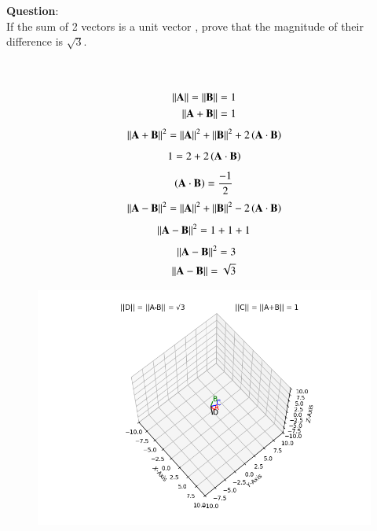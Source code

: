 \documentclass[journal]{IEEEtran}
\begin{document}
\textbf{Question}:\\
If the sum of 2 vectors is a unit vector , prove that the magnitude of their difference is $\sqrt{3}$.\hfill{}\\
\\ \solution \\
    \begin{table}[h!]    
      \centering
      
      \caption{}
    \end{table}
    \begin{align}
        \left\vert\left\vert\mathbf{A}\right\vert\right\vert = \left\vert\left\vert\mathbf{B}\right\vert\right\vert = 1 \\ \label{eq1.11.12.1}
        \left\vert\left\vert\mathbf{A}+\mathbf{B}\right\vert\right\vert = 1 
    \end{align}
    \begin{align}
        \left\vert\left\vert\mathbf{A}+\mathbf{B}\right\vert\right\vert^2 = \left\vert\left\vert\mathbf{A}\right\vert\right\vert^2 + \left\vert\left\vert\mathbf{B}\right\vert\right\vert^2 + 2\left(\mathbf{A} \cdot \mathbf{B}\right)\label{eq1.11.12.2}
    \end{align}
    \begin{align}
        1 = 2 + 2\left(\mathbf{A} \cdot \mathbf{B}\right) \label{eq1.11.12.3}
    \end{align}
    \begin{align}
        \left(\mathbf{A} \cdot \mathbf{B}\right) = \frac{-1}{2} \label{eq1.11.12.4}
    \end{align}
    \begin{align}
        \left\vert\left\vert\mathbf{A}-\mathbf{B}\right\vert\right\vert^2 = \left\vert\left\vert\mathbf{A}\right\vert\right\vert^2 + \left\vert\left\vert\mathbf{B}\right\vert\right\vert^2 - 2\left(\mathbf{A} \cdot \mathbf{B}\right) \label{1.11.12.5}
    \end{align}
    \begin{align}
        \left\vert\left\vert\mathbf{A}-\mathbf{B}\right\vert\right\vert^2 = 1 + 1 + 1 \label{1.11.12.6} 
    \end{align}
    \begin{align}
        \left\vert\left\vert\mathbf{A}-\mathbf{B}\right\vert\right\vert^2 = 3 \\
        \left\vert\left\vert\mathbf{A}-\mathbf{B}\right\vert\right\vert = \sqrt{3}
    \end{align}
    \begin{figure}[h]
        \centering
       \includegraphics[width=\linewidth]{figs/fig1.png}
       \caption{}
       \label{graph}
    \end{figure}
\end{document}
